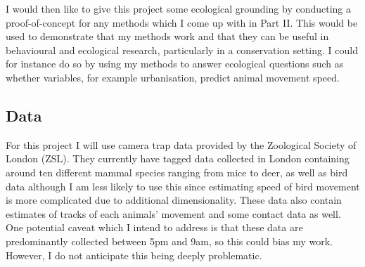 \documentclass[11pt]{article}
\begin{document}
	I would then like to give this project some ecological grounding by conducting a proof-of-concept for any methods which I come up with in Part II. This would be used to demonstrate that my methods work and that they can be useful in behavioural and ecological research, particularly in a conservation setting. I could for instance do so by using my methods to answer ecological questions such as whether variables, for example urbanisation, predict animal movement speed.
	
	
	\subsection{Data}
	
	For this project I will use camera trap data provided by the Zoological Society of London (ZSL). They currently have tagged data collected in London containing around ten different mammal species ranging from mice to deer, as well as bird data although I am less likely to use this since estimating speed of bird movement is more complicated due to additional dimensionality. These data also contain estimates of tracks of each animals' movement and some contact data as well. One potential caveat which I intend to address is that these data are predominantly collected between 5pm and 9am, so this could bias my work. However, I do not anticipate this being deeply problematic.
	
		
	

	
	
	
	
\end{document}
